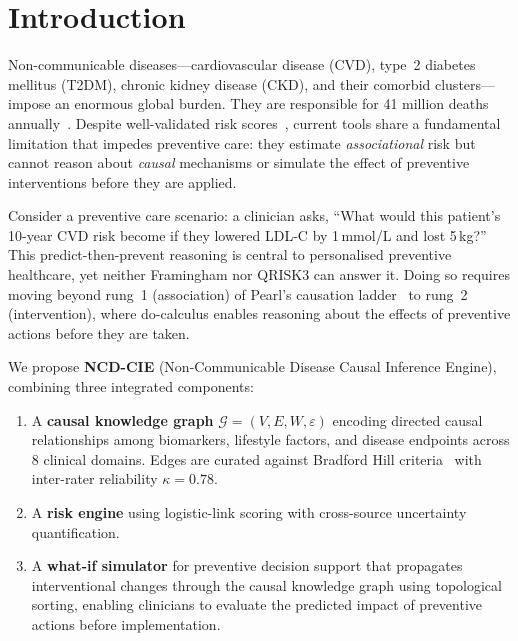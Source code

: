 \documentclass[runningheads]{llncs}
\begin{document}
\section{Introduction}\label{sec:intro}

Non-communicable diseases---cardiovascular disease (CVD), type~2
diabetes mellitus (T2DM), chronic kidney disease (CKD), and their
comorbid clusters---impose an enormous global burden.
They are responsible for 41 million deaths
annually~\cite{who2021ncd}.
Despite well-validated risk scores~\cite{dagostino2008,hippisley2017qrisk3,score22021},
current tools share a fundamental limitation that impedes preventive care:
they estimate \emph{associational} risk but cannot reason about
\emph{causal} mechanisms or simulate the effect of preventive interventions
before they are applied.

Consider a preventive care scenario: a clinician asks,
``What would this patient's 10-year CVD risk become if they lowered
LDL-C by 1\,mmol/L and lost 5\,kg?''
This predict-then-prevent reasoning is central to personalised
preventive healthcare, yet neither Framingham nor QRISK3 can answer it.
Doing so requires moving beyond rung~1 (association) of Pearl's
causation ladder~\cite{pearl2018book} to rung~2 (intervention),
where do-calculus enables reasoning about the effects of preventive
actions before they are taken.

We propose \textbf{NCD-CIE} (Non-Communicable Disease Causal Inference
Engine), combining three integrated components:
\begin{enumerate}
\item A \textbf{causal knowledge graph} $\mathcal{G}=(V,E,W,\varepsilon)$
  encoding directed causal relationships among biomarkers, lifestyle
  factors, and disease endpoints across 8 clinical domains.
  Edges are curated against Bradford Hill
  criteria~\cite{hill1965environment} with inter-rater reliability
  $\kappa=0.78$.
\item A \textbf{risk engine} using logistic-link scoring with
  cross-source uncertainty quantification.
\item A \textbf{what-if simulator} for preventive decision support
  that propagates interventional changes through the causal knowledge
  graph using topological sorting, enabling clinicians to evaluate
  the predicted impact of preventive actions before implementation.
\end{enumerate}
\end{document}
